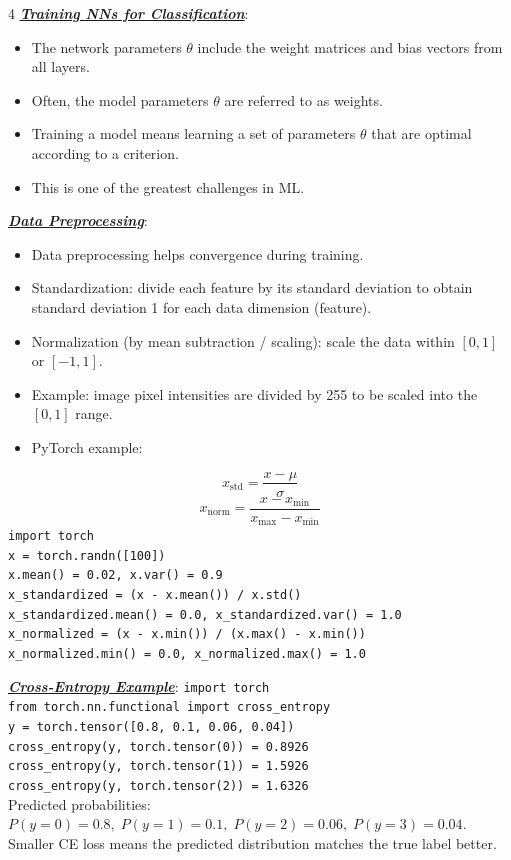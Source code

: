 \documentclass[12pt]{article}
\newcommand{\bulletPoint}[1]{\ul{\textit{\textbf{#1}}}}
\begin{document}
\begin{multicols*}{4}
\bulletPoint{Training NNs for Classification}:
\begin{itemize}
\item The network parameters $\theta$ include the weight matrices and bias vectors from all layers.
\item Often, the model parameters $\theta$ are referred to as weights.
\item Training a model means learning a set of parameters $\theta$ that are optimal according to a criterion.
\item This is one of the greatest challenges in ML.
\end{itemize}

\bulletPoint{Data Preprocessing}:
\begin{itemize}
\item Data preprocessing helps convergence during training.
\item Standardization: divide each feature by its standard deviation to obtain standard deviation 1 for each data dimension (feature).
\item Normalization (by mean subtraction / scaling): scale the data within $[0,1]$ or $[-1,1]$.
\item Example: image pixel intensities are divided by 255 to be scaled into the $[0,1]$ range.
\item PyTorch example:
\end{itemize}
\useshortskip
\begin{equation*}
    x_{\text{std}}=\frac{x-\mu}{\sigma}
\end{equation*}
\useshortskip
\begin{equation*}
    x_{\text{norm}}=\frac{x-x_{\min}}{x_{\max}-x_{\min}}
\end{equation*}
\texttt{import torch}\\
\texttt{x = torch.randn([100])}\\
\texttt{x.mean() = 0.02, x.var() = 0.9}\\
\texttt{x\_standardized = (x - x.mean()) / x.std()}\\
\texttt{x\_standardized.mean() = 0.0, x\_standardized.var() = 1.0}\\
\texttt{x\_normalized = (x - x.min()) / (x.max() - x.min())}\\
\texttt{x\_normalized.min() = 0.0, x\_normalized.max() = 1.0}

\bulletPoint{Cross-Entropy Example}:
\texttt{import torch}\\
\texttt{from torch.nn.functional import cross\_entropy}\\
\texttt{y = torch.tensor([0.8, 0.1, 0.06, 0.04])}\\
\texttt{cross\_entropy(y, torch.tensor(0)) = 0.8926}\\
\texttt{cross\_entropy(y, torch.tensor(1)) = 1.5926}\\
\texttt{cross\_entropy(y, torch.tensor(2)) = 1.6326}\\
Predicted probabilities: $P(y=0)=0.8,\; P(y=1)=0.1,\; P(y=2)=0.06,\; P(y=3)=0.04$.\\
Smaller CE loss means the predicted distribution matches the true label better.


\end{multicols*}
\end{document}
